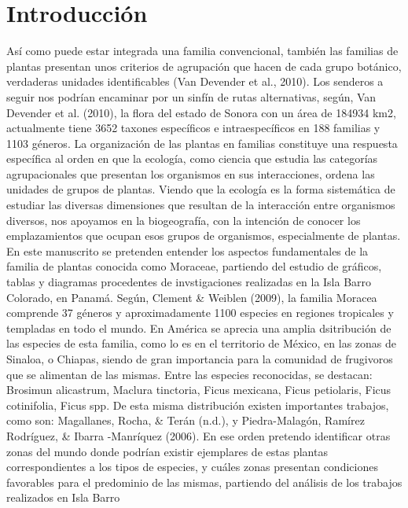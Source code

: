 \documentclass[11pt,]{article}
\begin{document}
\vskip 6.5pt


\noindent  \section{Introducción}\label{introducciuxf3n}

Así como puede estar integrada una familia convencional, también las
familias de plantas presentan unos criterios de agrupación que hacen de
cada grupo botánico, verdaderas unidades identificables (Van Devender et
al., 2010). Los senderos a seguir nos podrían encaminar por un sinfín de
rutas alternativas, según, Van Devender et al. (2010), la flora del
estado de Sonora con un área de 184934 km2, actualmente tiene 3652
taxones específicos e intraespecíficos en 188 familias y 1103 géneros.
La organización de las plantas en familias constituye una respuesta
específica al orden en que la ecología, como ciencia que estudia las
categorías agrupacionales que presentan los organismos en sus
interacciones, ordena las unidades de grupos de plantas. Viendo que la
ecología es la forma sistemática de estudiar las diversas dimensiones
que resultan de la interacción entre organismos diversos, nos apoyamos
en la biogeografía, con la intención de conocer los emplazamientos que
ocupan esos grupos de organismos, especialmente de plantas. En este
manuscrito se pretenden entender los aspectos fundamentales de la
familia de plantas conocida como Moraceae, partiendo del estudio de
gráficos, tablas y diagramas procedentes de invstigaciones realizadas en
la Isla Barro Colorado, en Panamá. Según, Clement \& Weiblen (2009), la
familia Moracea comprende 37 géneros y aproximadamente 1100 especies en
regiones tropicales y templadas en todo el mundo. En América se aprecia
una amplia dsitribución de las especies de esta familia, como lo es en
el territorio de México, en las zonas de Sinaloa, o Chiapas, siendo de
gran importancia para la comunidad de frugivoros que se alimentan de las
mismas. Entre las especies reconocidas, se destacan: Brosimun
alicastrum, Maclura tinctoria, Ficus mexicana, Ficus petiolaris, Ficus
cotinifolia, Ficus spp. De esta misma distribución existen importantes
trabajos, como son: Magallanes, Rocha, \& Terán (n.d.), y
Piedra-Malagón, Ramírez Rodríguez, \& Ibarra -Manríquez (2006). En ese
orden pretendo identificar otras zonas del mundo donde podrían existir
ejemplares de estas plantas correspondientes a los tipos de especies, y
cuáles zonas presentan condiciones favorables para el predominio de las
mismas, partiendo del análisis de los trabajos realizados en Isla Barro
\end{document}
